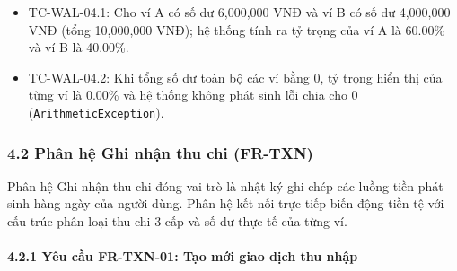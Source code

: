 \documentclass[11pt,a4paper]{article}
\providecommand{\tightlist}{
  \setlength{\itemsep}{0pt}\setlength{\parskip}{0pt}}
\begin{document}
\begin{itemize}
  \begin{itemize}
  \tightlist
  \item
    TC-WAL-04.1: Cho ví A có số dư 6,000,000 VNĐ và ví B có số dư
    4,000,000 VNĐ (tổng 10,000,000 VNĐ); hệ thống tính ra tỷ trọng của
    ví A là 60.00\% và ví B là 40.00\%.
  \item
    TC-WAL-04.2: Khi tổng số dư toàn bộ các ví bằng 0, tỷ trọng hiển thị
    của từng ví là 0.00\% và hệ thống không phát sinh lỗi chia cho 0
    (\texttt{ArithmeticException}).
  \end{itemize}
\end{itemize}

\newpage

\subsubsection{4.2 Phân hệ Ghi nhận thu chi
(FR-TXN)}\label{42-phuxe2n-hux1ec7-ghi-nhux1eadn-thu-chi-fr-txn}

Phân hệ Ghi nhận thu chi đóng vai trò là nhật ký ghi chép các luồng tiền
phát sinh hàng ngày của người dùng. Phân hệ kết nối trực tiếp biến động
tiền tệ với cấu trúc phân loại thu chi 3 cấp và số dư thực tế của từng
ví.

\paragraph{4.2.1 Yêu cầu FR-TXN-01: Tạo mới giao dịch thu
nhập}\label{421-yuxeau-cux1ea7u-fr-txn-01-tux1ea1o-mux1edbi-giao-dux1ecbch-thu-nhux1eadp}
\end{document}
